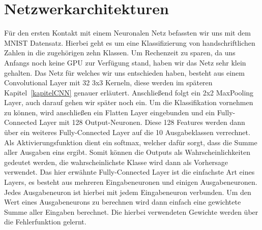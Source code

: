 \section{Netzwerkarchitekturen}
Für den ersten Kontakt mit einem Neuronalen Netz befassten wir uns mit dem MNIST Datensatz. Hierbei geht es um eine Klassifizierung von handschriftlichen Zahlen in die zugehörigen zehn Klassen. Um Rechenzeit zu sparen, da uns Anfangs noch keine GPU zur Verfügung stand, haben wir das Netz sehr klein gehalten. Das Netz für welches wir uns entschieden haben, besteht aus einem Convolutional Layer mit 32 3x3 Kerneln, diese werden im späteren Kapitel~\ref{kapitelCNN} genauer erläutert. Anschließend folgt ein 2x2 MaxPooling Layer, auch darauf gehen wir später noch ein. Um die Klassifikation vornehmen zu können, wird anschließen ein Flatten Layer eingebunden und ein Fully-Connected Layer mit 128 Output-Neuronen. Diese 128 Features werden dann über ein weiteres Fully-Connected Layer auf die 10 Ausgabeklassen verrechnet. Als Aktivierungsfunktion dient ein softmax, welcher dafür sorgt, dass die Summe aller Ausgaben eins ergibt. Somit können die Outputs als Wahrscheinlichkeiten gedeutet werden, die wahrscheinlichste Klasse wird dann als Vorhersage verwendet.
Das hier erwähnte Fully-Connected Layer ist die einfachste Art eines Layers, es besteht aus mehreren Eingabeneuronen und einigen Ausgabeneuronen. Jedes Ausgabeneuron ist hierbei mit jedem Eingabeneuron verbunden. Um den Wert eines Ausgabeneurons zu berechnen wird dann einfach eine gewichtete Summe aller Eingaben berechnet. Die hierbei verwendeten Gewichte werden über die Fehlerfunktion gelernt.

